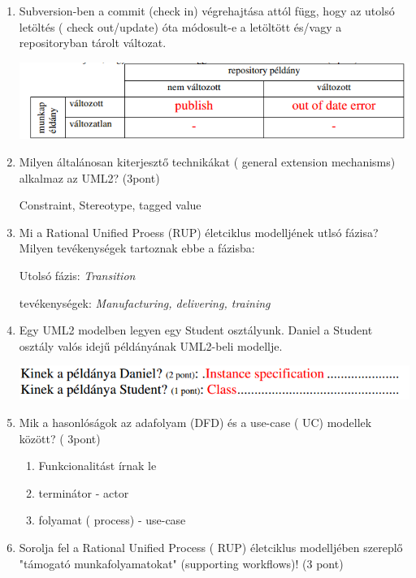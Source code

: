 \begin{enumerate}
	\item Subversion-ben a commit (check in) végrehajtása attól függ, hogy az utolsó letöltés ( check out/update) óta módosult-e a letöltött és/vagy a repositoryban tárolt változat.

		\begin{center}
			\includegraphics[scale=0.7]{img/table15}
		\end{center}

	\item Milyen általánosan kiterjesztő technikákat ( general extension mechanisms) alkalmaz az UML2? (3pont)

		Constraint, Stereotype, tagged value

	\item Mi a Rational Unified Proess (RUP) életciklus modelljének utlsó fázisa? Milyen tevékenységek tartoznak ebbe a fázisba:

	Utolsó fázis: \textit{Transition}

	tevékenységek: \textit{Manufacturing, delivering, training}

	\item Egy UML2 modelben legyen egy Student osztályunk. Daniel a Student osztály valós idejű példányának UML2-beli modellje.

		\begin{center}
			\includegraphics[scale=0.7]{img/table16}
		\end{center}

	\item Mik a hasonlóságok az adafolyam (DFD) és a use-case ( UC) modellek között? ( 3pont)

		\begin{enumerate}
			\item Funkcionalitást írnak le
			\item terminátor - actor
			\item folyamat ( process) - use-case
		\end{enumerate}

	\item Sorolja fel a Rational Unified Process ( RUP) életciklus modelljében szereplő "támogató munkafolyamatokat" (supporting workflows)! (3 pont)


\end{enumerate}
